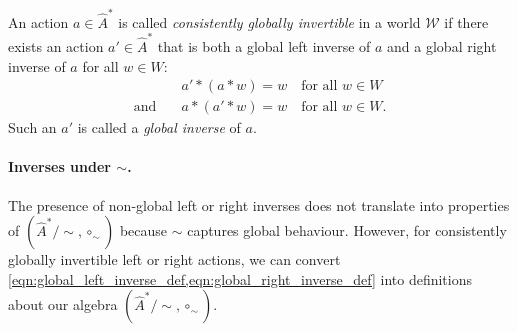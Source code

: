 An action $a \in \hat{A}^{*}$ is called \emph{consistently globally invertible} in a world $\mathscr{W}$ if there exists an action $a' \in \hat{A}^{*}$ that is both a global left inverse of $a$ and a global right inverse of $a$ for all $w \in W$:
\begin{equation}
\begin{aligned}
    & a' \ast (a \ast w) = w \quad \text{for all $w \in W$} \\
    \text{and} \quad & a \ast (a' \ast w) = w \quad \text{for all $w \in W$}.
\end{aligned}
\end{equation}
Such an $a'$ is called a \emph{global inverse} of $a$.

\paragraph{
Inverses under $\sim$.
}

The presence of non-global left or right inverses does not translate into properties of $(\hat{A}^{*}/\sim, \circ_{\sim})$ because $\sim$ captures global behaviour.
However, for consistently globally invertible left or right actions, we can convert \cref{eqn:global_left_inverse_def,eqn:global_right_inverse_def} into definitions about our algebra $(\hat{A}^{*}/\sim, \circ_{\sim})$.

